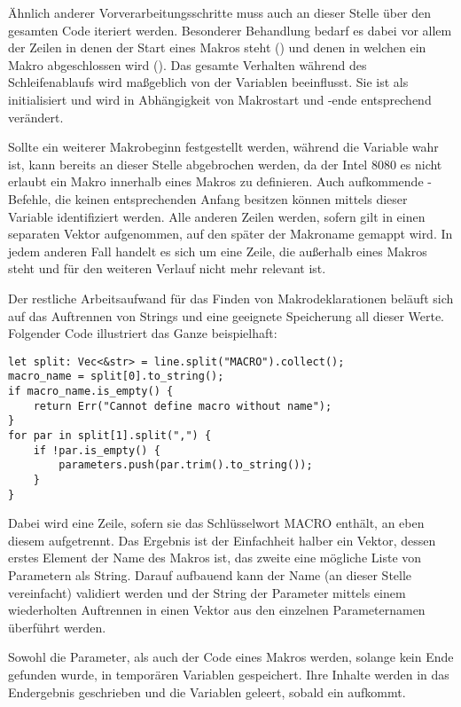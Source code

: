 Ähnlich anderer Vorverarbeitungsschritte muss auch an dieser Stelle über den gesamten Code iteriert werden. Besonderer Behandlung bedarf es dabei vor allem der Zeilen in denen der Start eines Makros steht () und denen in welchen ein Makro abgeschlossen wird (). Das gesamte Verhalten während des Schleifenablaufs wird maßgeblich von der Variablen  beeinflusst. Sie ist als  initialisiert und wird in Abhängigkeit von Makrostart und -ende entsprechend verändert. 

Sollte ein weiterer Makrobeginn festgestellt werden, während die Variable wahr ist, kann bereits an dieser Stelle abgebrochen werden, da der Intel 8080 es nicht erlaubt ein Makro innerhalb eines Makros zu definieren. Auch aufkommende -Befehle, die keinen entsprechenden Anfang besitzen können mittels dieser Variable identifiziert werden. Alle anderen Zeilen werden, sofern  gilt in einen separaten Vektor aufgenommen, auf den später der Makroname gemappt wird. In jedem anderen Fall handelt es sich um eine Zeile, die außerhalb eines Makros steht und für den weiteren Verlauf nicht mehr relevant ist.

Der restliche Arbeitsaufwand für das Finden von Makrodeklarationen beläuft sich auf das Auftrennen von Strings und eine geeignete Speicherung all dieser Werte. Folgender Code illustriert das Ganze beispielhaft:

\begin{verbatim}
let split: Vec<&str> = line.split("MACRO").collect();
macro_name = split[0].to_string();
if macro_name.is_empty() {
    return Err("Cannot define macro without name");
}
for par in split[1].split(",") {
    if !par.is_empty() {
        parameters.push(par.trim().to_string());
    }
}
\end{verbatim}

Dabei wird eine Zeile, sofern sie das Schlüsselwort \glqq MACRO\grqq{} enthält, an eben diesem aufgetrennt. Das Ergebnis ist der Einfachheit halber ein Vektor, dessen erstes Element der Name des Makros ist, das zweite eine mögliche Liste von Parametern als String. Darauf aufbauend kann der Name (an dieser Stelle vereinfacht) validiert werden und der String der Parameter mittels einem wiederholten Auftrennen in einen Vektor aus den einzelnen Parameternamen überführt werden.

Sowohl die Parameter, als auch der Code eines Makros werden, solange kein Ende gefunden wurde, in temporären Variablen gespeichert. Ihre Inhalte werden in das Endergebnis geschrieben und die Variablen geleert, sobald ein  aufkommt.

